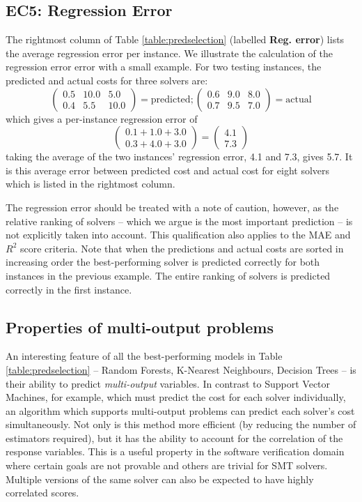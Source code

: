 \subsection{EC5: Regression Error}

The rightmost column of Table \ref{table:predselection} (labelled \textbf{Reg. error}) lists the average regression error per instance. 
We illustrate the calculation of the regression error error with a small example. For two testing instances, the predicted and actual costs for three solvers are: 
\[ \left( \begin{array}{ccc}
0.5 & 10.0 & 5.0 \\
0.4 & 5.5 & 10.0  \end{array} \right) = \text{predicted};
\left( \begin{array}{ccc}
0.6 & 9.0 & 8.0 \\
0.7 & 9.5 & 7.0 \end{array} \right) = \text{actual}\]
which gives a per-instance regression error of
\[ \left( \begin{array}{c}
0.1 + 1.0 + 3.0 \\
0.3 + 4.0 + 3.0
\end{array}  \right) = 
\left( \begin{array}{c}
4.1 \\
7.3
\end{array}  \right) \] 
taking the average of the two instances' regression error, 4.1 and 7.3, gives 5.7.
It is this average error between predicted cost and actual cost for eight solvers which is listed in the rightmost column.

The regression error should be treated with a note of caution, however, as the relative ranking of solvers -- which we argue is the most important prediction -- is not explicitly taken into account.
This qualification also applies to the MAE and $R^2$ score criteria. 
Note that when the predictions and actual costs are sorted in increasing order the best-performing solver is predicted correctly for both instances in the previous example.
The entire ranking of solvers is predicted correctly in the first instance.

\subsection{Properties of multi-output problems}
\label{sub:multi}

An interesting feature of all the best-performing models in Table \ref{table:predselection} -- Random Forests, K-Nearest Neighbours, Decision Trees -- is their ability to predict \textit{multi-output} variables. 
In contrast to Support Vector Machines, for example, which must predict the cost for each solver individually, an algorithm which supports multi-output problems can predict each solver's cost simultaneously. 
Not only is this method more efficient (by reducing the number of estimators required), but it has the ability to account for the correlation of the response variables. 
This is a useful property in the software verification domain where certain goals are not provable and others are trivial for SMT solvers. 
Multiple versions of the same solver can also be expected to have highly correlated scores.


